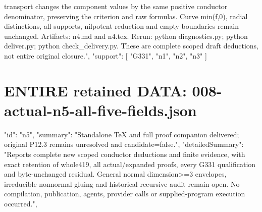 \documentclass[11pt]{article}
\begin{document}
\begin{Full422Data}
{transport changes the component values by the same positive conductor denominator, preserving the criterion and raw formulas. Curve min(f,0), radial distinctions, all supports, nilpotent reduction and empty boundaries remain unchanged. Artifacts: n4.md and n4.tex. Rerun: python diagnostics.py; python deliver.py; python check_delivery.py. These are complete scoped draft deductions, not entire original closure.",
  "support": [
    "G331",
    "n1",
    "n2",
    "n3"
  ]
}

\end{Full422Data}
\section{ENTIRE retained DATA: 008-actual-n5-all-five-fields.json}
\begin{Full422Data}
{
  "id": "n5",
  "summary": "Standalone TeX and full proof companion delivered; original P12.3 remains unresolved and candidate=false.",
  "detailedSummary": "Reports complete new scoped conductor deductions and finite evidence, with exact retention of whole419, all actual/expanded proofs, every G331 qualification and byte-unchanged residual. General normal dimension>=3 envelopes, irreducible nonnormal gluing and historical recursive audit remain open. No compilation, publication, agents, provider calls or supplied-program execution occurred.",
}
\end{Full422Data}
\end{document}
